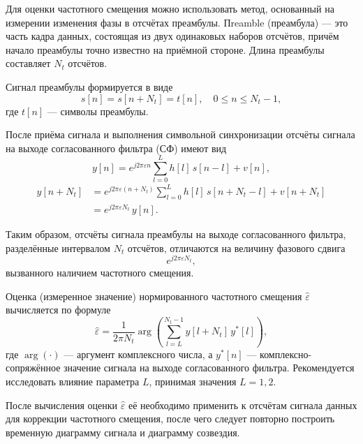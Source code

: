 Для оценки частотного смещения можно использовать метод, основанный на
измерении изменения фазы в отсчётах преамбулы. Пreamble (преамбула) —
это часть кадра данных, состоящая из двух одинаковых наборов отсчётов,
причём начало преамбулы точно известно на приёмной стороне. Длина
преамбулы составляет $N_t$ отсчётов.

Сигнал преамбулы формируется в виде
\begin{equation}
s[n] = s[n + N_t] = t[n], \quad 0 \le n \le N_t - 1,
\end{equation}
где $t[n]$ — символы преамбулы.

После приёма сигнала и выполнения символьной синхронизации отсчёты
сигнала на выходе согласованного фильтра (СФ) имеют вид
\begin{equation}
y[n] = e^{j 2 \pi \varepsilon n} \sum_{l=0}^{L} h[l]\, s[n-l] + v[n],
\end{equation}
\begin{equation}
\begin{aligned}
y[n + N_t] &= e^{j 2 \pi \varepsilon (n + N_t)}
\sum_{l=0}^{L} h[l]\, s[n + N_t - l] + v[n + N_t] \\
&= e^{j 2 \pi \varepsilon N_t} \, y[n].
\end{aligned}
\end{equation}

Таким образом, отсчёты сигнала преамбулы на выходе согласованного
фильтра, разделённые интервалом $N_t$ отсчётов, отличаются на величину
фазового сдвига
\begin{equation}
e^{j 2 \pi \varepsilon N_t},
\end{equation}
вызванного наличием частотного смещения.

Оценка (измеренное значение) нормированного частотного смещения
$\hat{\varepsilon}$ вычисляется по формуле
\begin{equation}
\hat{\varepsilon} =
\frac{1}{2 \pi N_t}
\arg\!\left(
\sum_{l=L}^{N_t-1} y[l + N_t] \, y^{*}[l]
\right),
\end{equation}
где $\arg(\cdot)$ — аргумент комплексного числа, а $y^{*}[n]$ —
комплексно-сопряжённое значение сигнала на выходе согласованного
фильтра. Рекомендуется исследовать влияние параметра $L$, принимая
значения $L = 1, 2$.

После вычисления оценки $\hat{\varepsilon}$ её необходимо применить к
отсчётам сигнала данных для коррекции частотного смещения, после чего
следует повторно построить временную диаграмму сигнала и диаграмму
созвездия.


\endinput
